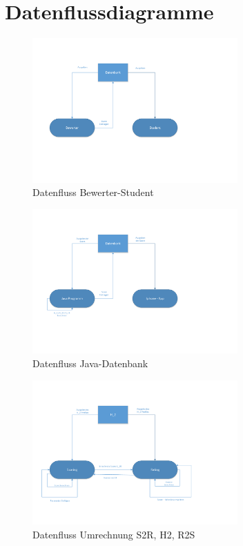 \documentclass[a4paper,listof=leveldown,listof=numbered]{scrreprt}
\begin{document}
	\section{Datenflussdiagramme}
	\begin{figure}
		\centering
		\includegraphics[width=0.7\textwidth]{img/DTD_1_BewerterStudent.pdf}
		\caption{Datenfluss Bewerter-Student}
	\end{figure}
	\begin{figure}
		\centering
		\includegraphics[width=0.7\textwidth]{img/DTD_2_JavaDB.pdf}
		\caption{Datenfluss Java-Datenbank}
	\end{figure}
	\begin{figure}
		\centering
		\includegraphics[width=0.7\textwidth]{img/DTD_3_H2SR.pdf}
		\caption{Datenfluss Umrechnung S2R, H2, R2S}
	\end{figure}
	
	
	\listoftables
		
\end{document}
